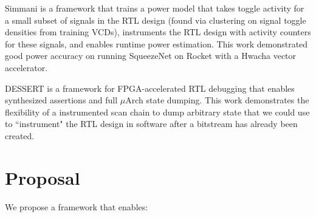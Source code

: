 \documentclass[sigconf]{acmart}
\begin{document}
Simmani\cite{simmani} is a framework that trains a power model that takes toggle activity for a small subset of signals in the RTL design (found via clustering on signal toggle densities from training VCDs), instruments the RTL design with activity counters for these signals, and enables runtime power estimation.
This work demonstrated good power accuracy on running SqueezeNet on Rocket with a Hwacha vector accelerator.

DESSERT\cite{dessert} is a framework for FPGA-accelerated RTL debugging that enables synthesized assertions and full $\mu$Arch state dumping.
This work demonstrates the flexibility of a instrumented scan chain to dump arbitrary state that we could use to ``instrument" the RTL design in software after a bitstream has already been created.

\section{Proposal}
We propose a framework that enables:
\end{document}
